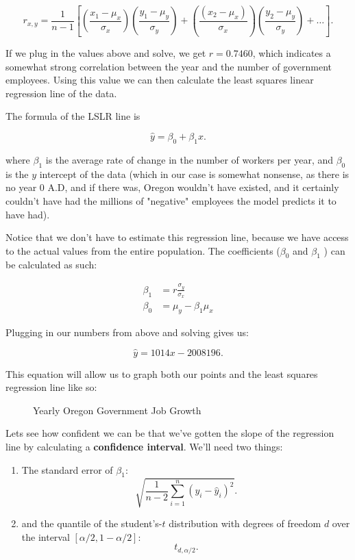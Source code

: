 \documentclass[letterpaper]{article}
\theoremstyle{definition}
\begin{document}
\[
r_{x, y} = \frac{1}{n-1}\left[ \left( \frac{x_{1}-\mu_{x}}{\sigma_{x}} \right)\left(
\frac{y_{1}-\mu_{y}}{\sigma_{y}} \right) +
\left(\frac{(x_{2}-\mu_{x})}{\sigma_{x}}\right)\left( \frac{y_{2}-\mu_{y}}{\sigma_{y}} \right) + \dots \right]
.\] 

If we plug in the values above and solve, we get $r=0.7460$, which indicates a somewhat
strong correlation between the year and the number of government employees.
Using this value we can then calculate the least squares linear regression line of the data. 

The formula of the LSLR line is

\[
\hat{y} = \beta_0 +\beta_1x
.\] 

where $\beta_1$ is the average rate of change in the number of workers per year, and
$\beta_0$ is the $y$ intercept of the data (which in our case is somewhat nonsense, as
there is no year 0 A.D, and if there was, Oregon wouldn't have existed, and
it certainly couldn't have had the millions of "negative" employees the model predicts it to
have had).

Notice that we don't have to estimate this regression line, because we have access to the
actual values from the entire population. The coefficients ($\beta_0$ and $\beta_1$ ) can
be calculated as such:

\begin{align}
\beta_{1}  &= r \frac{\sigma_{y}}{\sigma_{x}} \\
\beta_{0}  & = \mu_y-\beta_{1}\mu_x
\end{align}

Plugging in our numbers from above and solving gives us:

\[
\hat{y} = 1014x - 2008196
.\] 

This equation will allow us to graph both our points and the least squares regression line
like so:

\begin{figure}[H]
	\caption{Yearly Oregon Government Job Growth}
	\label{fig:3}
	\center
\end{figure}
    

Lets see how confident we can be that we've gotten the slope of the regression line by
calculating a \textbf{confidence interval}. We'll need two things:

\begin{enumerate}
	\item The standard error of $\beta_1$: \[
	\sqrt{ \frac{1}{n-2} \sum_{i=1}^{n}(y_{i}-\hat{y}_{i})^{2} }
	.\] 
\item and the quantile of the student's-$t$ distribution with degrees of freedom $d$ over
	the interval $[\alpha / 2, 1-\alpha / 2]$:
	\[
	t_{d, \alpha / 2}
	.\] 
\end{enumerate}
    
\end{document}

